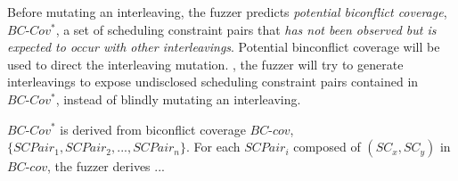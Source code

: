 Before mutating an interleaving, the fuzzer predicts \textit{potential
  biconflict coverage}, $BC\mbox{-}Cov^*$, a set of scheduling
constraint pairs that \textit{has not been observed but is expected to
  occur with other interleavings}.
%
Potential binconflict coverage will be used to direct the interleaving
mutation. \ie, the fuzzer will try to generate interleavings to expose
undisclosed scheduling constraint pairs contained in
$BC\mbox{-}Cov^*$, instead of blindly mutating an interleaving.


$BC\mbox{-}Cov^*$ is derived from biconflict coverage $BC\mbox{-}cov$,
$\{SCPair_1, SCPair_2, ..., SCPair_n\}$.
%
For each $SCPair_i$ composed of $(SC_x, SC_y)$ in $BC\mbox{-}cov$, the
fuzzer derives ...










